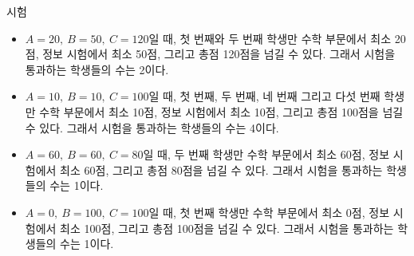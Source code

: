 \begin{problem}{시험}
	\begin{itemize}
		\item $A=20,\ B=50,\ C=120$일 때, 첫 번째와 두 번째 학생만 수학 부문에서 최소 20점, 정보 시험에서 최소 50점, 그리고 총점 120점을 넘길 수 있다. 그래서 시험을 통과하는 학생들의 수는 2이다.
		\item $A=10,\ B=10,\ C=100$일 때, 첫 번째, 두 번째, 네 번째 그리고 다섯 번째 학생만 수학 부문에서 최소 10점, 정보 시험에서 최소 10점, 그리고 총점 100점을 넘길 수 있다. 그래서 시험을 통과하는 학생들의 수는 4이다.
		\item $A=60,\ B=60,\ C=80$일 때, 두 번째 학생만 수학 부문에서 최소 60점, 정보 시험에서 최소 60점, 그리고 총점 80점을 넘길 수 있다. 그래서 시험을 통과하는 학생들의 수는 1이다.
		\item $A=0,\ B=100,\ C=100$일 때, 첫 번째 학생만 수학 부문에서 최소 0점, 정보 시험에서 최소 100점, 그리고 총점 100점을 넘길 수 있다. 그래서 시험을 통과하는 학생들의 수는 1이다.
	\end{itemize}
	
	
	
	
\end{problem}

